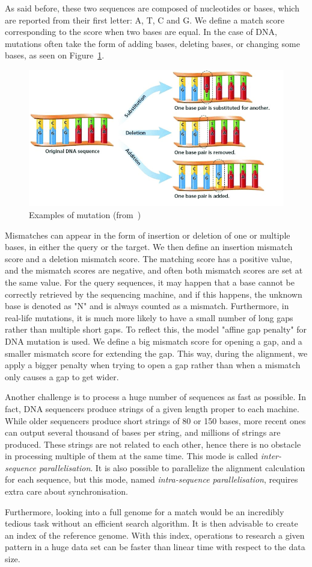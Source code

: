 As said before, these two sequences are composed of nucleotides or bases, which are reported from their first letter: A, T, C and G. We define a match score corresponding to the score when two bases are equal. In the case of DNA, mutations often take the form of adding bases, deleting bases, or changing some bases, as seen on Figure~\ref{fig:mutation}. 
\begin{figure}[h!]
	\centering
	\includegraphics[width=0.7\linewidth]{mutation}
	\caption{Examples of mutation (from~\cite{alasadi:chemistry})}
	\label{fig:mutation}
\end{figure}
Mismatches can appear in the form of insertion or deletion of one or multiple bases, in either the query or the target. We then define an insertion mismatch score and a deletion mismatch score. The matching score has a positive value, and the mismatch scores are negative, and often both mismatch scores are set at the same value. For the query sequences, it may happen that a base cannot be correctly retrieved by the sequencing machine, and if this happens, the unknown base is denoted as "N" and is always counted as a mismatch. Furthermore, in real-life mutations, it is much more likely to have a small number of long gaps rather than multiple short gaps. To reflect this, the model "affine gap penalty" for DNA mutation is used. We define a big mismatch score for opening a gap, and a smaller mismatch score for extending the gap. This way, during the alignment, we apply a bigger penalty when trying to open a gap rather than when a mismatch only causes a gap to get wider. 

Another challenge is to process a huge number of sequences as fast as possible. In fact, DNA sequencers produce strings of a given length proper to each machine. While older sequencers produce short strings of 80 or 150 bases, more recent ones can output several thousand of bases per string, and millions of strings are produced. These strings are not related to each other, hence there is no obstacle in processing multiple of them at the same time. This mode is called \emph{inter-sequence parallelisation}. It is also possible to parallelize the alignment calculation for each sequence, but this mode, named \emph{intra-sequence parallelisation}, requires extra care about synchronisation.

Furthermore, looking into a full genome for a match would be an incredibly tedious task without an efficient search algorithm. It is then advisable to create an index of the reference genome. With this index, operations to research a given pattern in a huge data set can be faster than linear time with respect to the data size.

